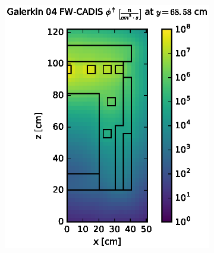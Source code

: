\begin{figure}[!htb]
\begin{subfigure}{0.4\textwidth}
\includegraphics[max height=0.445\textheight]
{img/dlvn-plots/fwc-adj/flux-gkn04-slice.eps}
\end{subfigure}
\\
\begin{subfigure}{0.4\textwidth}

\end{subfigure}
\end{figure}
